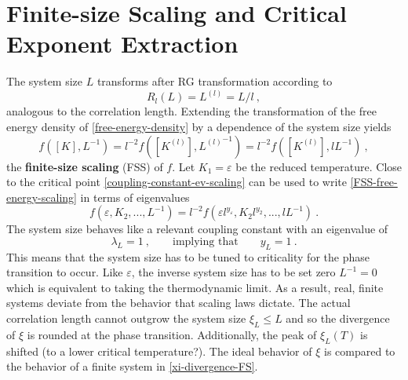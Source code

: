 	\section{Finite-size Scaling and Critical Exponent Extraction} \label{Section::FSS}
	The system size $L$ transforms after RG transformation according to
	\begin{equation}
		R_l(L) =	L^{(l)} =	L /	l ~,
	\end{equation}
	analogous to the correlation length. Extending the transformation of the free energy density of \autoref{free-energy-density} by a dependence of the system size yields
	\begin{equation}\label{FSS-free-energy-scaling}
		f\left([K], L^{-1}\right) =	l^{-2} f\left([K^{(l)}], {L^{(l)}}^{-1}\right) = l^{-2} f\left([K^{(l)}], l{L}^{-1}\right)	 ~,
	\end{equation}
	the \textbf{finite-size scaling} (FSS) of $f$.
	Let $K_1 =	\varepsilon$ be the reduced temperature. Close to the critical point \autoref{coupling-constant-ev-scaling} can be used to write \autoref{FSS-free-energy-scaling} in terms of eigenvalues
	\begin{equation}
		f\left(\varepsilon, K_2, ..., L^{-1}\right) = l^{-2} f\left(\varepsilon l^{y_\varepsilon}, K_2 l^{y_2}, ..., l{L}^{-1}\right)	 ~.
	\end{equation}
	The system size behaves like a relevant coupling constant with an eigenvalue of
	\begin{equation}
		\lambda_L =	1~, \qquad \text{implying that} \qquad y_L =	1 ~.
	\end{equation}
	This means that the system size has to be tuned to criticality for the phase transition to occur. Like $\varepsilon$, the inverse system size has to be set zero $L^{-1} =	0$ which is equivalent to taking the thermodynamic limit. As a result, real, finite systems deviate from the behavior that scaling laws dictate. The actual correlation length cannot outgrow the system size $\xi_L \leq L$ and so the divergence of $\xi$ is rounded at the phase transition. Additionally,  the peak of $\xi_L(T)$ is shifted \cite{guton1983phase} (to a lower critical temperature?). The ideal behavior of $\xi$ is compared to the behavior of a finite system in  \autoref{xi-divergence-FS}. \\
	
